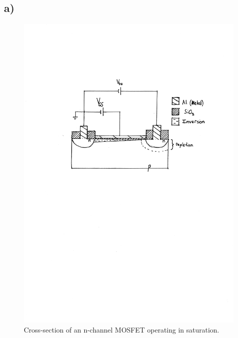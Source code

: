 \subsection*{a)}
\begin{figure}[htbp!]
	\flushright
	\includegraphics[trim={4cm 15cm 2.9cm 5cm},clip]{./img/4a}
	\caption{Cross-section of an n-channel MOSFET operating in saturation.}
\end{figure}
